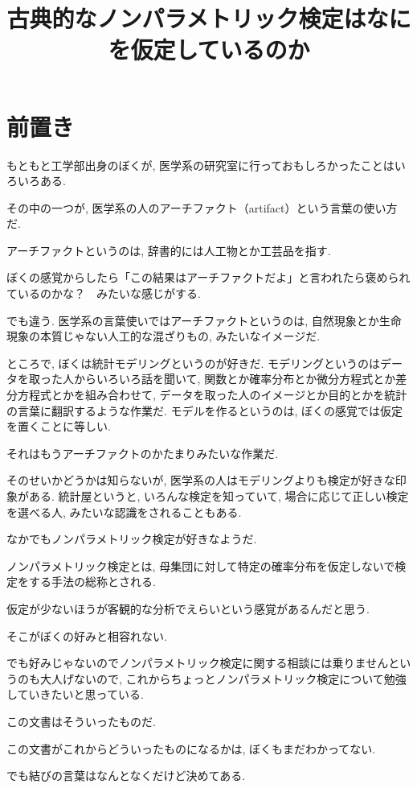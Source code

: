 \documentclass[12pt]{jsarticle}
\title{古典的なノンパラメトリック検定はなにを仮定しているのか}
\author{}
\begin{document}
\maketitle
\section{前置き}

もともと工学部出身のぼくが, 医学系の研究室に行っておもしろかったことはいろいろある. 

その中の一つが, 医学系の人のアーチファクト（artifact）という言葉の使い方だ. 

アーチファクトというのは, 辞書的には人工物とか工芸品を指す.

ぼくの感覚からしたら「この結果はアーチファクトだよ」と言われたら褒められているのかな？　みたいな感じがする.

でも違う. 医学系の言葉使いではアーチファクトというのは, 自然現象とか生命現象の本質じゃない人工的な混ざりもの, みたいなイメージだ.

ところで, ぼくは統計モデリングというのが好きだ. モデリングというのはデータを取った人からいろいろ話を聞いて, 関数とか確率分布とか微分方程式とか差分方程式とかを組み合わせて, データを取った人のイメージとか目的とかを統計の言葉に翻訳するような作業だ. モデルを作るというのは, ぼくの感覚では仮定を置くことに等しい. 

それはもうアーチファクトのかたまりみたいな作業だ.

そのせいかどうかは知らないが, 医学系の人はモデリングよりも検定が好きな印象がある. 統計屋というと, いろんな検定を知っていて, 場合に応じて正しい検定を選べる人, みたいな認識をされることもある.

なかでもノンパラメトリック検定が好きなようだ. 

ノンパラメトリック検定とは, 母集団に対して特定の確率分布を仮定しないで検定をする手法の総称とされる. 

仮定が少ないほうが客観的な分析でえらいという感覚があるんだと思う.

そこがぼくの好みと相容れない. 

でも好みじゃないのでノンパラメトリック検定に関する相談には乗りませんというのも大人げないので, これからちょっとノンパラメトリック検定について勉強していきたいと思っている.

この文書はそういったものだ. 

この文書がこれからどういったものになるかは, ぼくもまだわかってない.

でも結びの言葉はなんとなくだけど決めてある. 
\end{document}
